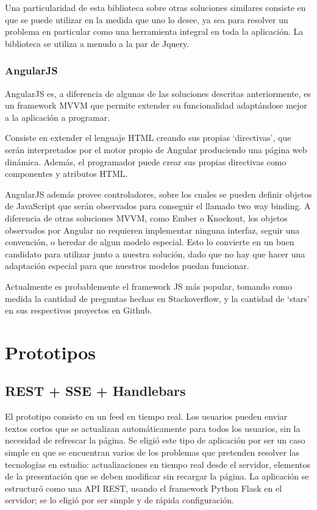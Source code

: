 \documentclass[doc,helv,longtable]{article}
\begin{document}
Una particularidad de esta biblioteca sobre otras soluciones similares consiste en que se puede utilizar en la medida que uno lo desee, ya sea para resolver un problema en particular como una herramienta integral en toda la aplicación. La biblioteca se utiliza a menudo a la par de Jquery. 

\subsubsection{AngularJS}
AngularJS\cite{angular} es, a diferencia de algunas de las soluciones descritas anteriormente, es un framework MVVM que permite extender su funcionalidad adaptándose mejor a la aplicación a programar. 

Consiste en extender el lenguaje HTML creando sus propias ‘directivas’\cite{directive}, que serán interpretados por el motor propio de Angular produciendo una página web dinámica. Además, el programador puede crear sus propias directivas como componentes y atributos HTML.

AngularJS además provee controladores, sobre los cuales se pueden definir objetos de JavaScript que serán observados para conseguir el llamado two way binding. A diferencia de otras soluciones MVVM, como Ember o Knockout, los objetos observados por Angular no requieren implementar ninguna interfaz, seguir una convención, o heredar de algun modelo especial. Esto lo convierte en un buen candidato para utilizar junto a nuestra solución, dado que no hay que hacer una adaptación especial para que nuestros modelos puedan funcionar. 

Actualmente es probablemente el framework JS más popular, tomando como medida la cantidad de preguntas hechas en Stackoverflow\cite{knockoutso}\cite{emberso}\cite{angularso}, y la cantidad de ‘stars’ en sus respectivos proyectos en Github\cite{githubstars}.

\section{Prototipos}
\subsection{REST + SSE + Handlebars}
El prototipo\cite{fodder} consiste en un feed en tiempo real. Los usuarios pueden enviar textos cortos que se actualizan automáticamente para todos los usuarios, sin la necesidad de refrescar la página. Se eligió este tipo de aplicación por ser un caso simple en que se encuentran varios de los problemas que pretenden resolver las tecnologías en estudio: actualizaciones en tiempo real desde el servidor, elementos de la presentación que se deben modificar sin recargar la página. La aplicación se estructuró como una API REST, usando el framework Python Flask\cite{flask} en el servidor; se lo eligió por ser simple y de rápida configuración. 
\end{document}
